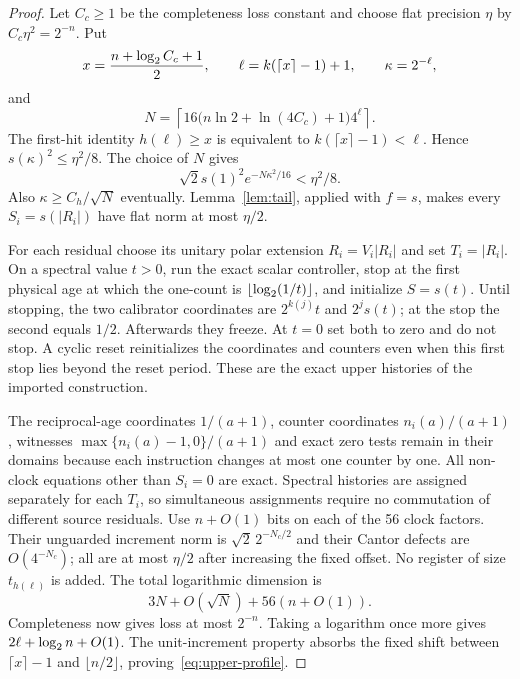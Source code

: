 \begin{proof}
Let $C_c\ge1$ be the completeness loss constant and choose flat precision $\eta$ by $C_c\eta^2=2^{-n}$. Put
\[
 x=\frac{n+\log_2 C_c+1}{2},\qquad
 \ell=k(\lceil x\rceil-1)+1,\qquad \kappa=2^{-\ell},
\]
and
\[
 N=\left\lceil16\bigl(n\ln2+\ln(4C_c)+1\bigr)4^\ell\right\rceil.
\]
The first-hit identity $h(\ell)\ge x$ is equivalent to $k(\lceil x\rceil-1)<\ell$. Hence $s(\kappa)^2\le\eta^2/8$. The choice of $N$ gives
\[
 \sqrt2s(1)^2e^{-N\kappa^2/16}<\eta^2/8.
\]
Also $\kappa\ge C_h/\sqrt N$ eventually. Lemma~\ref{lem:tail}, applied with $f=s$, makes every $S_i=s(|R_i|)$ have flat norm at most $\eta/2$.

For each residual choose its unitary polar extension $R_i=V_i|R_i|$ and set $T_i=|R_i|$. On a spectral value $t>0$, run the exact scalar controller, stop at the first physical age at which the one-count is $\lfloor\log_2(1/t)\rfloor$, and initialize $S=s(t)$. Until stopping, the two calibrator coordinates are $2^{k(j)}t$ and $2^js(t)$; at the stop the second equals $1/2$. Afterwards they freeze. At $t=0$ set both to zero and do not stop. A cyclic reset reinitializes the coordinates and counters even when this first stop lies beyond the reset period. These are the exact upper histories of the imported construction.

The reciprocal-age coordinates $1/(a+1)$, counter coordinates $n_i(a)/(a+1)$, witnesses $\max\{n_i(a)-1,0\}/(a+1)$ and exact zero tests remain in their domains because each instruction changes at most one counter by one. All non-clock equations other than $S_i=0$ are exact. Spectral histories are assigned separately for each $T_i$, so simultaneous assignments require no commutation of different source residuals. Use $n+O(1)$ bits on each of the 56 clock factors. Their unguarded increment norm is $\sqrt2\,2^{-N_c/2}$ and their Cantor defects are $O(4^{-N_c})$; all are at most $\eta/2$ after increasing the fixed offset. No register of size $t_{h(\ell)}$ is added. The total logarithmic dimension is
\[
 3N+O(\sqrt N)+56(n+O(1)).
\]
Completeness now gives loss at most $2^{-n}$. Taking a logarithm once more gives $2\ell+\log_2 n+O(1)$. The unit-increment property absorbs the fixed shift between $\lceil x\rceil-1$ and $\lfloor n/2\rfloor$, proving~\eqref{eq:upper-profile}.


\end{proof}
